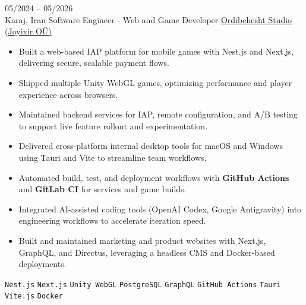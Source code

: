 \entry
{05/2024 -- 05/2026 \\ Karaj, Iran}
{Software Engineer - Web and Game Developer}
{\href{https://www.joyixir.com/}{Ordibehesht Studio  (Joyixir OÜ)}}
{\vspace{-10pt}
    \begin{itemize}[noitemsep,topsep=0pt,parsep=0pt,partopsep=0pt, leftmargin=-1pt]
        \item Built a web-based IAP platform for mobile games with Nest.js and Next.js, delivering secure, scalable payment flows.
        \item Shipped multiple Unity WebGL games, optimizing performance and player experience across browsers.
        \item Maintained backend services for IAP, remote configuration, and A/B testing to support live feature rollout and experimentation.
        \item Delivered cross-platform internal desktop tools for macOS and Windows using Tauri and Vite to streamline team workflows.
        \item Automated build, test, and deployment workflows with \textbf{GitHub Actions} and \textbf{GitLab CI} for services and game builds.
        \item Integrated AI-assisted coding tools (OpenAI Codex, Google Antigravity) into engineering workflows to accelerate iteration speed.
        \item Built and maintained marketing and product websites with Next.js, GraphQL, and Directus, leveraging a headless CMS and Docker-based deployments.
    \end{itemize}
    \texttt{Nest.js} \slashsep \texttt{Next.js} \slashsep \texttt{Unity WebGL} \slashsep \texttt{PostgreSQL} \slashsep \texttt{GraphQL} \slashsep \texttt{GitHub Actions} \slashsep \texttt{Tauri} \slashsep \texttt{Vite.js} \slashsep \texttt{Docker}
}
